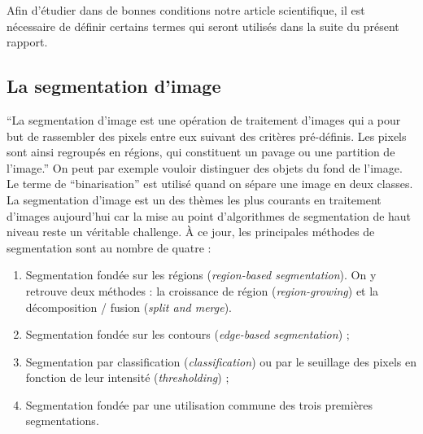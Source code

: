 Afin d'étudier dans de bonnes conditions notre article scientifique, il est nécessaire de définir certains termes qui seront utilisés dans la suite du présent rapport.

\subsection{La segmentation d'image}
	\enquote{La segmentation d'image est une opération de traitement d'images qui a pour but de rassembler des pixels entre eux suivant des critères pré-définis. Les pixels sont ainsi regroupés en régions, qui constituent un pavage ou une partition de l'image.}\cite{wikiSegmentationImage} On peut par exemple vouloir distinguer des objets du fond de l'image. Le terme de \enquote{binarisation} est utilisé quand on sépare une image en deux classes.\\

	La segmentation d'image est un des thèmes les plus courants en traitement d'images aujourd'hui car la mise au point d'algorithmes de segmentation de haut niveau reste un véritable challenge. À ce jour, les principales méthodes de segmentation sont au nombre de quatre :
	\vspace{10px}
	\begin{enumerate}
		\item Segmentation fondée sur les régions (\textit{region-based segmentation}). On y retrouve deux méthodes : la croissance de région (\textit{region-growing}) et la décomposition / fusion (\textit{split and merge}).
		\item Segmentation fondée sur les contours (\textit{edge-based segmentation}) ;
		\item Segmentation par classification (\textit{classification}) ou par le seuillage des pixels en fonction de leur intensité (\textit{thresholding}) ;
		\item Segmentation fondée par une utilisation commune des trois premières segmentations.
	\end{enumerate}